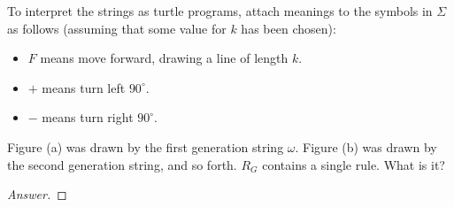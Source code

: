\documentclass[10pt]{article}
\begin{document}
\begin{enumerate}[1)]
To interpret the strings as turtle programs, attach meanings to the symbols in $\Sigma$ as follows (assuming that some value for $k$ has been chosen):
\begin{itemize}
\item
$F$ means move forward, drawing a line of length $k$.
\item
$+$ means turn left $90^\circ$.
\item
$-$ means turn right $90^\circ$.
\end{itemize}

Figure (a) was drawn by the first generation string $\omega$.  Figure (b) was drawn by the second generation string, and so forth.  $R_G$ contains a single rule.  What is it?
\begin{proof}[Answer]
\end{proof}
\end{enumerate}
\end{document}
